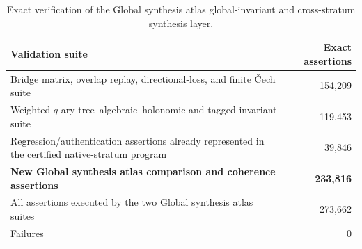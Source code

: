 \begin{table}[htbp]
\centering
\caption{Exact verification of the Global synthesis atlas global-invariant and cross-stratum synthesis layer.}
\label{tab:block13-combined-validation}
\small
\begin{tabularx}{\textwidth}{@{}Y r@{}}
\toprule
Validation suite & Exact assertions\\
\midrule
Bridge matrix, overlap replay, directional-loss, and finite \v{C}ech suite & 154,209\\
Weighted $q$-ary tree--algebraic--holonomic and tagged-invariant suite & 119,453\\
\midrule
Regression/authentication assertions already represented in the certified native-stratum program & 39,846\\
\textbf{New Global synthesis atlas comparison and coherence assertions} & \textbf{233,816}\\
All assertions executed by the two Global synthesis atlas suites & 273,662\\
Failures & 0\\
\bottomrule
\end{tabularx}
\end{table}
